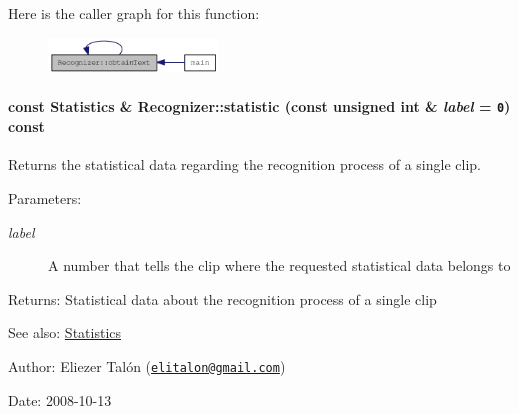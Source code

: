 Here is the caller graph for this function:\nopagebreak
\begin{figure}[H]
\begin{center}
\leavevmode
\includegraphics[width=128pt]{class_recognizer_008a0ea69a912ff54882dd20d18adcf9_icgraph}
\end{center}
\end{figure}
\hypertarget{class_recognizer_b941b1ad42c3bacb3c829acf7fc689de}{
\paragraph[{statistic}]{\setlength{\rightskip}{0pt plus 5cm}const {\bf Statistics} \& Recognizer::statistic (const unsigned int \& {\em label} = {\tt 0}) const}\hfill}
\label{class_recognizer_b941b1ad42c3bacb3c829acf7fc689de}


Returns the statistical data regarding the recognition process of a single clip. 

\begin{Desc}
\item[Parameters:]
\begin{description}
\item[{\em label}]A number that tells the clip where the requested statistical data belongs to\end{description}
\end{Desc}
\begin{Desc}
\item[Returns:]Statistical data about the recognition process of a single clip\end{Desc}
\begin{Desc}
\item[See also:]\hyperlink{class_statistics}{Statistics}\end{Desc}
\begin{Desc}
\item[Author:]Eliezer Talón (\href{mailto:elitalon@gmail.com}{\tt elitalon@gmail.com}) \end{Desc}
\begin{Desc}
\item[Date:]2008-10-13 \end{Desc}


